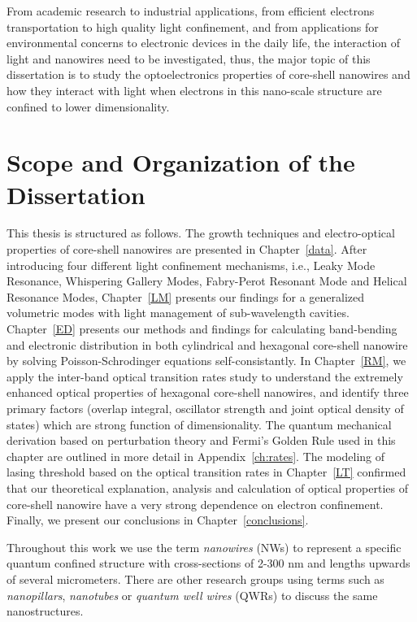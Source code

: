 From academic research to industrial applications, from efficient electrons
transportation to high quality light confinement, and from applications for
environmental concerns to electronic devices in the daily life, the interaction of
light and nanowires need to be investigated, thus, the major topic of this
dissertation is to study the optoelectronics properties of core-shell nanowires
and how they interact with light when electrons in this nano-scale structure
are confined to lower dimensionality.

\section{Scope and Organization of the Dissertation}

This thesis is structured as follows. The growth techniques and electro-optical
properties of core-shell nanowires are presented in Chapter~\ref{data}.  After
introducing four different light confinement mechanisms, i.e., Leaky Mode
Resonance, Whispering Gallery Modes, Fabry-Perot Resonant Mode and Helical
Resonance Modes, Chapter~\ref{LM} presents our findings for a generalized
volumetric modes with light management of sub-wavelength cavities.
Chapter~\ref{ED} presents our methods and findings for calculating band-bending
and electronic distribution in both cylindrical and hexagonal core-shell
nanowire by solving Poisson-Schrodinger equations self-consistantly.  In
Chapter~\ref{RM}, we apply the inter-band optical transition rates study to
understand the extremely enhanced optical properties of hexagonal core-shell
nanowires, and identify three primary factors (overlap integral, oscillator
strength and joint optical density of states) which are strong function of
dimensionality. The quantum mechanical derivation based on perturbation theory
and Fermi's Golden Rule used in this chapter are outlined in more detail in
Appendix~\ref{ch:rates}. The modeling of lasing threshold based on the optical
transition rates in Chapter~\ref{LT} confirmed that our theoretical
explanation, analysis and calculation of optical properties of core-shell
nanowire have a very strong dependence on electron confinement. Finally, we
present our conclusions in Chapter~\ref{conclusions}.

Throughout this work we use the term  {\em nanowires} (NWs) to represent a
specific quantum confined structure with cross-sections of 2-300 nm and lengths
upwards of several micrometers. There are other research groups using terms
such as {\em nanopillars}, {\em nanotubes} or {\em quantum well wires} (QWRs)
to discuss the same nanostructures.
